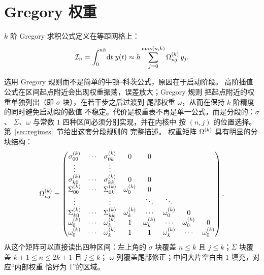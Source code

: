 \section{Gregory 权重}
\label{sec:gregory}

$k$ 阶 Gregory 求积公式定义在等距网格上：
\begin{equation}
    \mathcal{I}_n = \int^{nh}_{0}\!\mathrm{d} t\;y(t)
    \approx
    h\sum^{\max(n,k)}_{j=0}\Omega^{(k)}_{nj}\,y_j .
    \label{eq:gregory}
\end{equation}

选用 Gregory 规则而不是简单的牛顿--科茨公式，原因在于启动阶段。
高阶插值公式在区间起点附近会出现权重振荡，误差放大；Gregory 规则
把起点附近的权重单独列出（即 $\sigma$ 块），在若干步之后过渡到
尾部权重 $\omega$，从而在保持 $k$ 阶精度的同时避免启动段的数值
不稳定。代价是权重表不再是单一公式，而是分段的：$\sigma$、
$\Sigma$、$\omega$ 与常数 $1$ 四种区间必须分别实现，并在内核中
按 $(n,j)$ 的位置选择。第~\ref{sec:regimes}~节给出这套分段规则的
完整描述。
权重矩阵 $\Omega^{(k)}$ 具有明显的分块结构：
\begin{equation}
\Omega^{(k)}_{nj} =
\begin{pmatrix}
    \sigma^{(k)}_{00} & \cdots & \sigma^{(k)}_{0k} & 0 & 0 & & & \\
    \vdots & & \vdots & & & & & \\
    \sigma^{(k)}_{k0} & \cdots & \sigma^{(k)}_{kk} & 0 & 0 & & & \\
    \Sigma^{(k)}_{00} & \cdots & \Sigma^{(k)}_{0k} & \omega^{(k)}_0 & 0 & & & \\
    \vdots & & \vdots & & \ddots & \ddots & & \\
    \Sigma^{(k)}_{k0} & \cdots & \Sigma^{(k)}_{kk} & \omega^{(k)}_k & \cdots & \omega^{(k)}_0 & 0 & \\
    \omega^{(k)}_0 & \cdots & \omega^{(k)}_k & 1 & \omega^{(k)}_k & \cdots & \omega^{(k)}_0 & 0 \\
    \omega^{(k)}_0 & \cdots & \omega^{(k)}_k & 1 & 1 & \omega^{(k)}_k & \cdots & \omega^{(k)}_0
\end{pmatrix}.
\label{eq:omega-matrix}
\end{equation}
从这个矩阵可以直接读出四种区间：左上角的 $\sigma$ 块覆盖
$n\le k$ 且 $j\le k$；$\Sigma$ 块覆盖 $k+1\le n\le 2k+1$ 且 $j\le k$；
$\omega$ 列覆盖尾部修正；中间大片空白由 $1$ 填充，对应“内部权重
恰好为 1”的区域。

